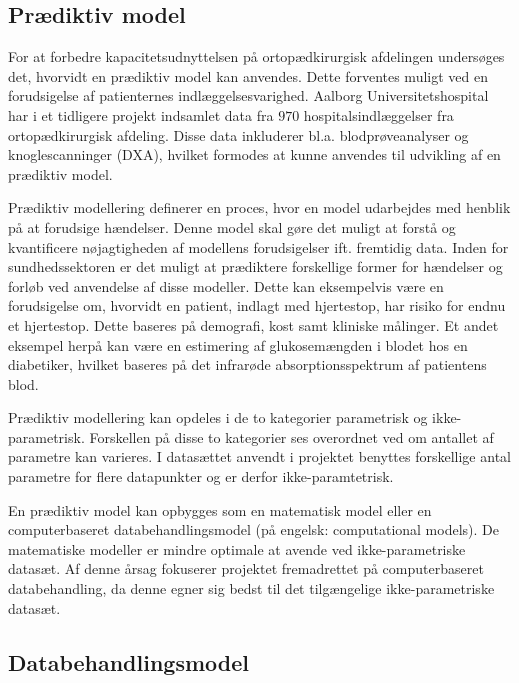 \subsection{Prædiktiv model}
For at forbedre kapacitetsudnyttelsen på ortopædkirurgisk afdelingen undersøges det, hvorvidt en prædiktiv model kan anvendes.
Dette forventes muligt ved en forudsigelse af patienternes indlæggelsesvarighed. Aalborg Universitetshospital har i et tidligere projekt indsamlet data fra $970$ hospitalsindlæggelser fra ortopædkirurgisk afdeling. Disse data inkluderer bl.a. blodprøveanalyser og knoglescanninger (DXA), hvilket formodes at kunne anvendes til udvikling af en prædiktiv model. 

\noindent
Prædiktiv modellering definerer en proces, hvor en model udarbejdes med henblik på at forudsige hændelser. Denne model skal gøre det muligt at forstå og kvantificere nøjagtigheden af modellens forudsigelser ift. fremtidig data.\cite{Kuhn2013} 
Inden for sundhedssektoren er det muligt at prædiktere forskellige former for hændelser og forløb ved anvendelse af disse modeller. Dette kan eksempelvis være en forudsigelse om, hvorvidt en patient, indlagt med hjertestop, har risiko for endnu et hjertestop. Dette baseres på demografi, kost samt kliniske målinger. Et andet eksempel herpå kan være en estimering af glukosemængden i blodet hos en diabetiker, hvilket baseres på det infrarøde absorptionsspektrum af patientens blod.\cite{Hastie2008}

\noindent
Prædiktiv modellering kan opdeles i de to kategorier parametrisk og ikke-parametrisk. Forskellen på disse to kategorier ses overordnet ved om antallet af parametre kan varieres. I datasættet anvendt i projektet benyttes forskellige antal parametre for flere datapunkter og er derfor ikke-paramtetrisk.\cite{Sheskin2000}

\noindent
En prædiktiv model kan opbygges som en matematisk model eller en computerbaseret databehandlingsmodel (på engelsk: computational models). De matematiske modeller er mindre optimale at avende ved ikke-parametriske datasæt. Af denne årsag fokuserer projektet fremadrettet på computerbaseret databehandling, da denne egner sig bedst til det tilgængelige ikke-parametriske datasæt.\cite{Sheskin2000} 

\subsection{Databehandlingsmodel}


